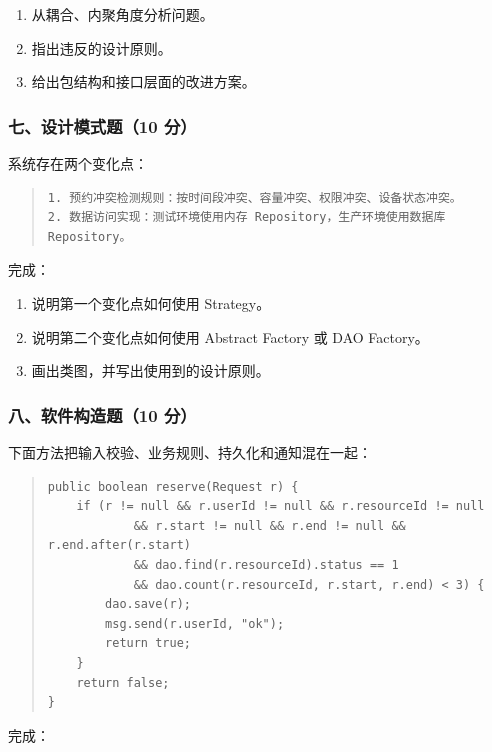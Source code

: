 \documentclass[UTF8,zihao=-4]{ctexart}
\begin{document}
\begin{enumerate}
\item 从耦合、内聚角度分析问题。
\item 指出违反的设计原则。
\item 给出包结构和接口层面的改进方案。
\end{enumerate}


\subsubsection*{七、设计模式题（10 分）}


系统存在两个变化点：


\begin{quote}
\footnotesize
\begin{verbatim}
1. 预约冲突检测规则：按时间段冲突、容量冲突、权限冲突、设备状态冲突。
2. 数据访问实现：测试环境使用内存 Repository，生产环境使用数据库 Repository。
\end{verbatim}
\end{quote}


完成：


\begin{enumerate}
\item 说明第一个变化点如何使用 Strategy。
\item 说明第二个变化点如何使用 Abstract Factory 或 DAO Factory。
\item 画出类图，并写出使用到的设计原则。
\end{enumerate}


\subsubsection*{八、软件构造题（10 分）}


下面方法把输入校验、业务规则、持久化和通知混在一起：


\begin{quote}
\footnotesize
\begin{verbatim}
public boolean reserve(Request r) {
    if (r != null && r.userId != null && r.resourceId != null
            && r.start != null && r.end != null && r.end.after(r.start)
            && dao.find(r.resourceId).status == 1
            && dao.count(r.resourceId, r.start, r.end) < 3) {
        dao.save(r);
        msg.send(r.userId, "ok");
        return true;
    }
    return false;
}
\end{verbatim}
\end{quote}


完成：
\end{document}
